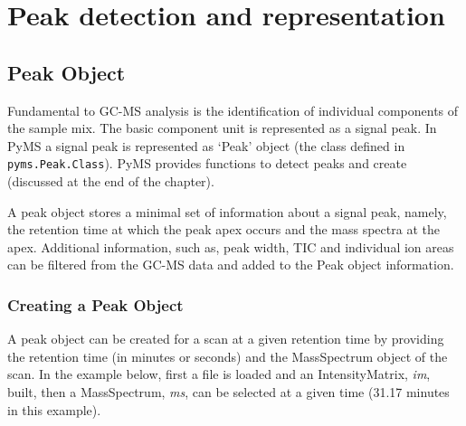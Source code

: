 

\chapter{Peak detection and representation}

\section{Peak Object}

Fundamental to GC-MS analysis is the identification of individual components
of the sample mix. The basic component unit is represented as a signal peak.
In PyMS a signal peak is represented as `Peak' object (the class defined in
{\tt pyms.Peak.Class}). PyMS provides functions to detect peaks and create
(discussed at the end of the chapter).

A peak object stores a minimal set of information about a signal peak, namely,
the retention time at which the peak apex occurs and the mass spectra at the
apex. Additional information, such as, peak width, TIC and individual ion areas
can be filtered from the GC-MS data and added to the Peak object information.

\subsection{Creating a Peak Object}


A peak object can be created for a scan at a given retention time by providing
the retention time (in minutes or seconds) and the MassSpectrum object of the
scan. In the example below, first a file is loaded and an IntensityMatrix,
{\em im}, built, then a MassSpectrum, {\em ms}, can be selected at a given
time (31.17 minutes in this example).

